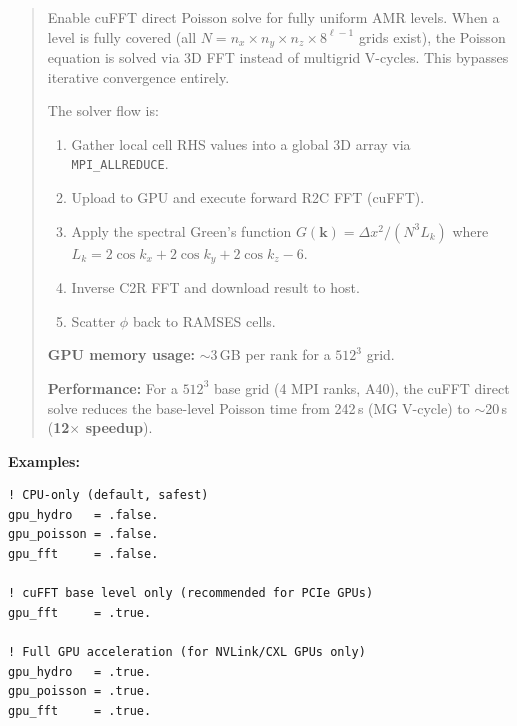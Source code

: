 \label{param:gpu_fft}

\begin{quote}
Enable cuFFT direct Poisson solve for fully uniform AMR levels.  When
a level is fully covered (all $N = n_x \times n_y \times n_z \times
8^{\ell-1}$ grids exist), the Poisson equation is solved via 3D FFT
instead of multigrid V-cycles.  This bypasses iterative convergence
entirely.

The solver flow is:
\begin{enumerate}[nosep]
  \item Gather local cell RHS values into a global 3D array via
        \texttt{MPI\_ALLREDUCE}.
  \item Upload to GPU and execute forward R2C FFT (cuFFT).
  \item Apply the spectral Green's function
        $G(\mathbf{k}) = \Delta x^2 / (N^3 L_k)$
        where $L_k = 2\cos k_x + 2\cos k_y + 2\cos k_z - 6$.
  \item Inverse C2R FFT and download result to host.
  \item Scatter $\phi$ back to RAMSES cells.
\end{enumerate}

\textbf{GPU memory usage:} $\sim$3\,GB per rank for a $512^3$ grid.

\textbf{Performance:} For a $512^3$ base grid (4 MPI ranks, A40),
the cuFFT direct solve reduces the base-level Poisson time from
242\,s (MG V-cycle) to $\sim$20\,s (\textbf{12$\times$ speedup}).


\end{quote}

\noindent\textcolor{apidefault}{\textsf{\textbf{Examples:}}}
\begin{lstlisting}
! CPU-only (default, safest)
gpu_hydro   = .false.
gpu_poisson = .false.
gpu_fft     = .false.

! cuFFT base level only (recommended for PCIe GPUs)
gpu_fft     = .true.

! Full GPU acceleration (for NVLink/CXL GPUs only)
gpu_hydro   = .true.
gpu_poisson = .true.
gpu_fft     = .true.
\end{lstlisting}

